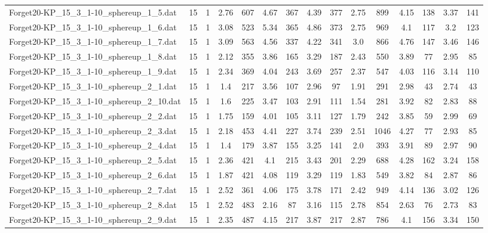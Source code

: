 \begin{table}[!ht]
{\begin{tabular}{lcccccccccccccc}
Forget20-KP\_15\_3\_1-10\_sphereup\_1\_5.dat & 15 & 1 & 2.76 & 607 & 4.67 & 367 & 4.39 & 377 & 2.75 & 899 & 4.15 & 138 & 3.37 & 141 \\
Forget20-KP\_15\_3\_1-10\_sphereup\_1\_6.dat & 15 & 1 & 3.08 & 523 & 5.34 & 365 & 4.86 & 373 & 2.75 & 969 & 4.1 & 117 & 3.2 & 123 \\
Forget20-KP\_15\_3\_1-10\_sphereup\_1\_7.dat & 15 & 1 & 3.09 & 563 & 4.56 & 337 & 4.22 & 341 & 3.0 & 866 & 4.76 & 147 & 3.46 & 146 \\
Forget20-KP\_15\_3\_1-10\_sphereup\_1\_8.dat & 15 & 1 & 2.12 & 355 & 3.86 & 165 & 3.29 & 187 & 2.43 & 550 & 3.89 & 77 & 2.95 & 85 \\
Forget20-KP\_15\_3\_1-10\_sphereup\_1\_9.dat & 15 & 1 & 2.34 & 369 & 4.04 & 243 & 3.69 & 257 & 2.37 & 547 & 4.03 & 116 & 3.14 & 110 \\
Forget20-KP\_15\_3\_1-10\_sphereup\_2\_1.dat & 15 & 1 & 1.4 & 217 & 3.56 & 107 & 2.96 & 97 & 1.91 & 291 & 2.98 & 43 & 2.74 & 43 \\
Forget20-KP\_15\_3\_1-10\_sphereup\_2\_10.dat & 15 & 1 & 1.6 & 225 & 3.47 & 103 & 2.91 & 111 & 1.54 & 281 & 3.92 & 82 & 2.83 & 88 \\
Forget20-KP\_15\_3\_1-10\_sphereup\_2\_2.dat & 15 & 1 & 1.75 & 159 & 4.01 & 105 & 3.11 & 127 & 1.79 & 242 & 3.85 & 59 & 2.99 & 69 \\
Forget20-KP\_15\_3\_1-10\_sphereup\_2\_3.dat & 15 & 1 & 2.18 & 453 & 4.41 & 227 & 3.74 & 239 & 2.51 & 1046 & 4.27 & 77 & 2.93 & 85 \\
Forget20-KP\_15\_3\_1-10\_sphereup\_2\_4.dat & 15 & 1 & 1.4 & 179 & 3.87 & 155 & 3.25 & 141 & 2.0 & 393 & 3.91 & 89 & 2.97 & 90 \\
Forget20-KP\_15\_3\_1-10\_sphereup\_2\_5.dat & 15 & 1 & 2.36 & 421 & 4.1 & 215 & 3.43 & 201 & 2.29 & 688 & 4.28 & 162 & 3.24 & 158 \\
Forget20-KP\_15\_3\_1-10\_sphereup\_2\_6.dat & 15 & 1 & 1.87 & 421 & 4.08 & 119 & 3.29 & 119 & 1.83 & 549 & 3.82 & 84 & 2.87 & 86 \\
Forget20-KP\_15\_3\_1-10\_sphereup\_2\_7.dat & 15 & 1 & 2.52 & 361 & 4.06 & 175 & 3.78 & 171 & 2.42 & 949 & 4.14 & 136 & 3.02 & 126 \\
Forget20-KP\_15\_3\_1-10\_sphereup\_2\_8.dat & 15 & 1 & 2.52 & 483 & 2.16 & 87 & 3.16 & 115 & 2.78 & 854 & 2.63 & 76 & 2.73 & 83 \\
Forget20-KP\_15\_3\_1-10\_sphereup\_2\_9.dat & 15 & 1 & 2.35 & 487 & 4.15 & 217 & 3.87 & 217 & 2.87 & 786 & 4.1 & 156 & 3.34 & 150 \\

\end{tabular}}
\end{table}
